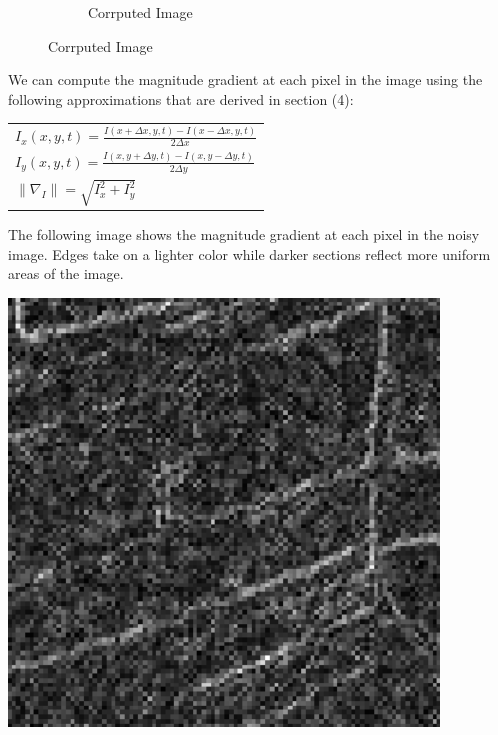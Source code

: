 \documentclass{article}
\begin{document}
\begin{figure}[!htb]
\begin{center}
\begin{subfigure}[b]{0.4\textwidth}
        \caption{Corrputed Image}
      \end{subfigure}
    \end{center}
  \end{figure}

  \noindent
  We can compute the magnitude gradient at each pixel in the image using the following
  approximations that are derived in section (4):
  \begin{center}
    \begin{tabular}{l}
      \vspace{12pt}
      $I_{x}(x,y,t) = \frac{I(x+\Delta x,y,t) - I(x-\Delta x,y,t)}{2\Delta x}$\\
      \vspace{12pt}
      $I_{y}(x,y,t) = \frac{I(x,y+\Delta y,t) - I(x,y-\Delta y,t)}{2\Delta y}$\\
      $\| \nabla_{I} \| = \sqrt{I_{x}^2 + I_{y}^2}$\\
    \end{tabular}
  \end{center}

  \noindent
  The following image shows the magnitude gradient at each pixel in the noisy image.
  Edges take on a lighter color while darker sections reflect more uniform areas of the image.
  \begin{center}
    \includegraphics[scale=0.5]{../report_images/noisy_grad.png}
  \end{center}
\end{document}
